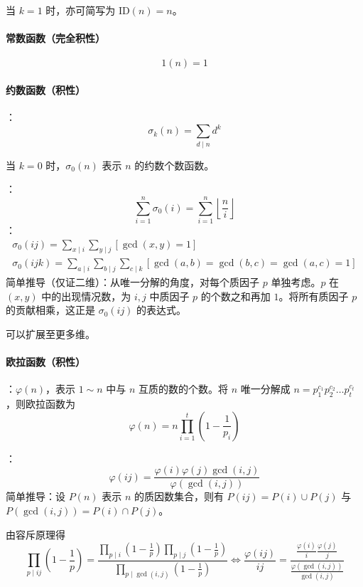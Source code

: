 当 $k = 1$ 时，亦可简写为 $\mathrm{ID}(n) = n$。

\paragraph{常数函数（完全积性）}
\[
1(n) = 1
\]

\paragraph{约数函数（积性）}

：
\[
\sigma_k(n) = \sum_{d \mid n} d^k
\]

当 $k = 0$ 时，$\sigma_0(n)$ 表示 $n$ 的约数个数函数。

：
\[
\sum_{i = 1}^n \sigma_0(i) = \sum_{i = 1}^n \left\lfloor \frac{n}{i} \right\rfloor
\]
：
\[
\begin{gathered}
\sigma_0(ij) = \sum_{x \mid i} \sum_{y \mid j} [\gcd(x, y) = 1] \\
\sigma_0(ijk) = \sum_{a \mid i} \sum_{b \mid j} \sum_{c \mid k} [\gcd(a, b) = \gcd(b, c) = \gcd(a, c) = 1]
\end{gathered}
\]
简单推导（仅证二维）：从唯一分解的角度，对每个质因子 $p$ 单独考虑。$p$ 在 $(x, y)$ 中的出现情况数，为 $i, j$ 中质因子 $p$ 的个数之和再加 $1$。将所有质因子 $p$ 的贡献相乘，这正是 $\sigma_0(ij)$ 的表达式。

可以扩展至更多维。

\paragraph{欧拉函数（积性）}

：$\varphi(n)$，表示 $1 \sim n$ 中与 $n$ 互质的数的个数。将 $n$ 唯一分解成 $n = p_1^{c_1}p_2^{c_2}\dots p_t^{c_t}$，则欧拉函数为
\[
\varphi(n) = n \prod_{i = 1}^t (1 - \frac{1}{p_i})
\]

：
\[
\varphi(ij) = \frac{\varphi(i) \varphi(j) \gcd(i, j)}{\varphi(\gcd(i, j))}
\]
简单推导：设 $P(n)$ 表示 $n$ 的质因数集合，则有 $P(ij) = P(i) \cup P(j)$ 与 $P(\gcd(i, j)) = P(i) \cap P(j)$。

由容斥原理得
\[
\prod_{p \mid ij} \left(1 - \frac{1}{p}\right) = \frac{\prod_{p \mid i} \left(1 - \frac{1}{p}\right) \prod_{p \mid j} \left(1 - \frac{1}{p}\right)}{\prod_{p \mid \gcd(i, j)} \left(1 - \frac{1}{p}\right)}
\iff
\frac{\varphi(ij)}{ij} = \frac{ \frac{\varphi(i)}{i} \frac{\varphi(j)}{j} }{\frac{\varphi(\gcd(i, j))}{\gcd(i, j)}}
\]

